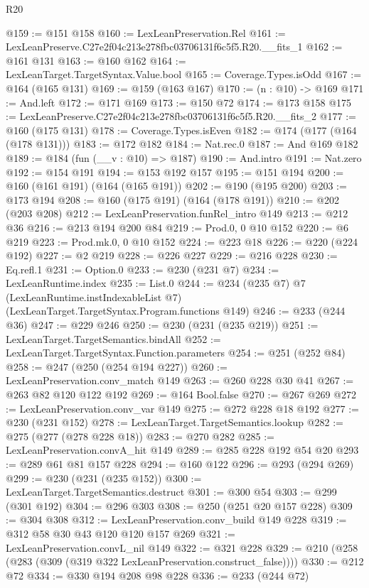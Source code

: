 \begin{lexlean}{R20}
\begin{coremodule}
@159 := @151 @158
@160 := LexLeanPreservation.Rel
@161 := LexLeanPreserve.C27e2f04c213e278fbc03706131f6c5f5.R20.__fits_1
@162 := @161 @131
@163 := @160 @162
@164 := LexLeanTarget.TargetSyntax.Value.bool
@165 := Coverage.Types.isOdd
@167 := @164 (@165 @131)
@169 := @159 (@163 @167)
@170 := (n : @10) -> @169
@171 := And.left
@172 := @171 @169
@173 := @150 @72
@174 := @173 @158
@175 := LexLeanPreserve.C27e2f04c213e278fbc03706131f6c5f5.R20.__fits_2
@177 := @160 (@175 @131)
@178 := Coverage.Types.isEven
@182 := @174 (@177 (@164 (@178 @131)))
@183 := @172 @182
@184 := Nat.rec.{0}
@187 := And @169 @182
@189 := @184 (fun (__v : @10) => @187)
@190 := And.intro
@191 := Nat.zero
@192 := @154 @191
@194 := @153 @192 @157
@195 := @151 @194
@200 := @160 (@161 @191) (@164 (@165 @191))
@202 := @190 (@195 @200)
@203 := @173 @194
@208 := @160 (@175 @191) (@164 (@178 @191))
@210 := @202 (@203 @208)
@212 := LexLeanPreservation.funRel_intro @149
@213 := @212 @36
@216 := @213 @194 @200 @84
@219 := Prod.{0, 0} @10 @152
@220 := @6 @219
@223 := Prod.mk.{0, 0} @10 @152
@224 := @223 @18
@226 := @220 (@224 @192)
@227 := @2 @219
@228 := @226 @227
@229 := @216 @228
@230 := Eq.refl.{1}
@231 := Option.{0}
@233 := @230 (@231 @7)
@234 := LexLeanRuntime.index
@235 := List.{0}
@244 := @234
    (@235 @7)
    @7
    (LexLeanRuntime.instIndexableList @7)
    (LexLeanTarget.TargetSyntax.Program.functions @149)
@246 := @233 (@244 @36)
@247 := @229 @246
@250 := @230 (@231 (@235 @219))
@251 := LexLeanTarget.TargetSemantics.bindAll
@252 := LexLeanTarget.TargetSyntax.Function.parameters
@254 := @251 (@252 @84)
@258 := @247 (@250 (@254 @194 @227))
@260 := LexLeanPreservation.conv_match @149
@263 := @260 @228 @30 @41
@267 := @263 @82 @120 @122 @192
@269 := @164 Bool.false
@270 := @267 @269
@272 := LexLeanPreservation.conv_var @149
@275 := @272 @228 @18 @192
@277 := @230 (@231 @152)
@278 := LexLeanTarget.TargetSemantics.lookup
@282 := @275 (@277 (@278 @228 @18))
@283 := @270 @282
@285 := LexLeanPreservation.convA_hit @149
@289 := @285 @228 @192 @54 @20
@293 := @289 @61 @81 @157 @228
@294 := @160 @122
@296 := @293 (@294 @269)
@299 := @230 (@231 (@235 @152))
@300 := LexLeanTarget.TargetSemantics.destruct
@301 := @300 @54
@303 := @299 (@301 @192)
@304 := @296 @303
@308 := @250 (@251 @20 @157 @228)
@309 := @304 @308
@312 := LexLeanPreservation.conv_build @149 @228
@319 := @312 @58 @30 @43 @120 @120 @157 @269
@321 := LexLeanPreservation.convL_nil @149
@322 := @321 @228
@329 := @210 (@258 (@283 (@309 (@319 @322 LexLeanPreservation.construct_false))))
@330 := @212 @72
@334 := @330 @194 @208 @98 @228
@336 := @233 (@244 @72)

\end{coremodule}
\end{lexlean}
